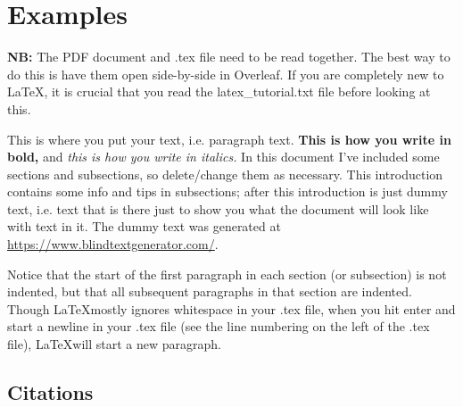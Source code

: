 \documentclass[11pt]{article}
\begin{document}
\maketitle

\tableofcontents

\newpage

\section{Examples}

\textbf{NB:} The PDF document and .tex file need to be read together. The best way to do this is have them open side-by-side in Overleaf. If you are completely new to \LaTeX, it is crucial that you read the latex\_tutorial.txt file before looking at this.

This is where you put your text, i.e. paragraph text. \textbf{This is how you write in bold,} and \textit{this is how you write in italics.} In this document I've included some sections and subsections, so delete/change them as necessary. This introduction contains some info and tips in subsections; after this introduction is just dummy text, i.e. text that is there just to show you what the document will look like with text in it. The dummy text was generated at \url{https://www.blindtextgenerator.com/}.

Notice that the start of the first paragraph in each section (or subsection) is not indented, but that all subsequent paragraphs in that section are indented. Though \LaTeX mostly ignores whitespace in your .tex file, when you hit enter and start a newline in your .tex file (see the line numbering on the left of the .tex file), \LaTeX will start a new paragraph. 

\subsection{Citations}
\end{document}
